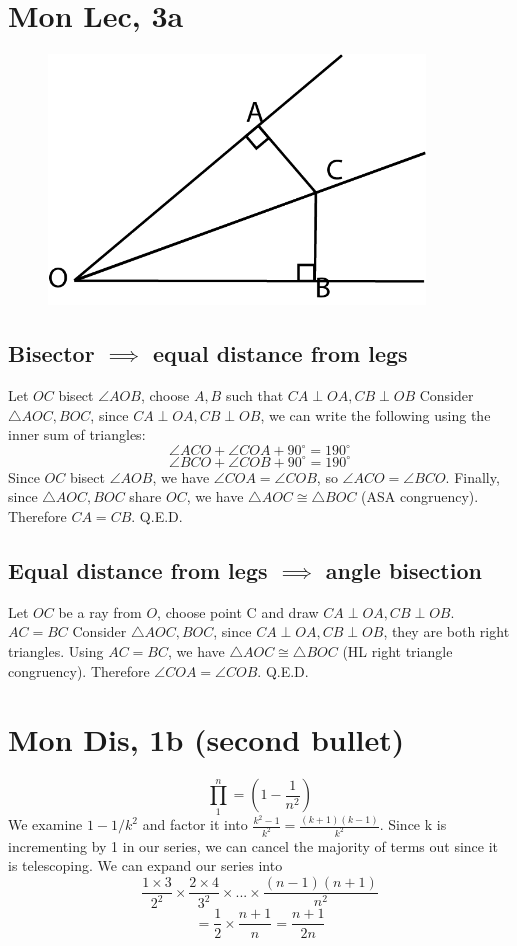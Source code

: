 \documentclass[12pt]{article}
\newcommand{\degrees}{^{\circ}}
\begin{document}
\section{Mon Lec, 3a}
\begin{figure}[h]
    \includegraphics[width = 100mm]{GRAPH2.png}
\end{figure}
\subsection{Bisector $\implies$ equal distance from legs}
Let $OC$ bisect $\angle AOB$, choose $A, B$ such that $CA \perp OA, CB \perp OB$
\newline
Consider $\triangle AOC, BOC$, since $CA \perp OA, CB \perp OB$, we can write the following using the inner sum of triangles:
$$\angle ACO + \angle COA + 90 \degrees = 190 \degrees$$
$$\angle BCO + \angle COB + 90 \degrees = 190 \degrees$$
Since $OC$ bisect $\angle AOB$, we have $\angle COA = \angle COB$, so $\angle ACO = \angle BCO$. Finally, since $\triangle AOC, BOC$ share $OC$, we have $\triangle AOC \cong \triangle BOC$ (ASA congruency). Therefore $CA = CB$. Q.E.D.

\subsection{Equal distance from legs $\implies$ angle bisection}
Let $OC$ be a ray from $O$, choose point C and draw $CA \perp OA, CB \perp OB$. $AC = BC$
\newline
Consider $\triangle AOC, BOC$, since $CA \perp OA, CB \perp OB$, they are both right triangles. Using $AC = BC$, we have $\triangle AOC \cong \triangle BOC$ (HL right triangle congruency). Therefore $\angle COA = \angle COB$.
Q.E.D.
\newpage


\section{Mon Dis, 1b (second bullet)}
$$\prod^{n}_{1}=(1-\frac{1}{n^2})$$
We examine $1-1/k^2$ and factor it into $\frac{k^2-1}{k^2} = \frac{(k+1)(k-1)}{k^2}$. Since k is incrementing by 1 in our series, we can cancel the majority of terms out since it is telescoping. We can expand our series into
$$\frac{1\times 3}{2^2} \times \frac{2 \times 4}{3^2} \times ...\times \frac{(n-1)(n+1)}{n^2}$$
$$= \frac{1}{2} \times \frac{n+1}{n} = \frac{n+1}{2n}$$
\end{document}

